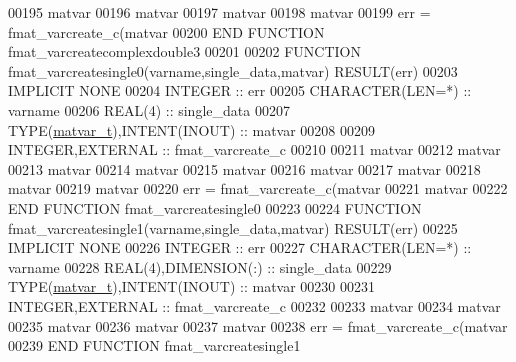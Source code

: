 \begin{DoxyCode}
00195     matvar%
00196     matvar%
00197     matvar%
00198     matvar%
00199     err = fmat\_varcreate\_c(matvar%
00200 \textcolor{keyword}{END FUNCTION }fmat\_varcreatecomplexdouble3
00201 
00202 \textcolor{keyword}{FUNCTION }fmat\_varcreatesingle0(varname,single\_data,matvar) \textcolor{keyword}{RESULT}(err)
00203 \textcolor{keywordtype}{IMPLICIT NONE}
00204     \textcolor{keywordtype}{INTEGER}                         :: err
00205     \textcolor{keywordtype}{CHARACTER(LEN=*)}                :: varname
00206     \textcolor{keywordtype}{REAL(4)}                         :: single\_data
00207     \textcolor{keywordtype}{TYPE}(\hyperlink{group___m_a_t_structmatvar__t}{matvar\_t}),\textcolor{keywordtype}{INTENT(INOUT)}    :: matvar
00208 
00209     \textcolor{keywordtype}{INTEGER},\textcolor{keywordtype}{EXTERNAL}                :: fmat\_varcreate\_c
00210 
00211     matvar%
00212     matvar%
00213     matvar%
00214     matvar%
00215     matvar%
00216     matvar%
00217     matvar%
00218     matvar%
00219     matvar%
00220     err = fmat\_varcreate\_c(matvar%
00221                            matvar%
00222 \textcolor{keyword}{END FUNCTION }fmat\_varcreatesingle0
00223 
00224 \textcolor{keyword}{FUNCTION }fmat\_varcreatesingle1(varname,single\_data,matvar) \textcolor{keyword}{RESULT}(err)
00225 \textcolor{keywordtype}{IMPLICIT NONE}
00226     \textcolor{keywordtype}{INTEGER}                         :: err
00227     \textcolor{keywordtype}{CHARACTER(LEN=*)}                :: varname
00228     \textcolor{keywordtype}{REAL(4)},\textcolor{keywordtype}{DIMENSION(:)}   :: single\_data
00229     \textcolor{keywordtype}{TYPE}(\hyperlink{group___m_a_t_structmatvar__t}{matvar\_t}),\textcolor{keywordtype}{INTENT(INOUT)}    :: matvar
00230 
00231     \textcolor{keywordtype}{INTEGER},\textcolor{keywordtype}{EXTERNAL}                :: fmat\_varcreate\_c
00232 
00233     matvar%
00234     matvar%
00235     matvar%
00236     matvar%
00237     matvar%
00238     err = fmat\_varcreate\_c(matvar%
00239 \textcolor{keyword}{END FUNCTION }fmat\_varcreatesingle1

\end{DoxyCode}
